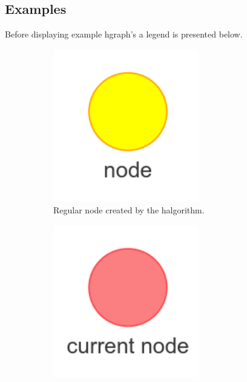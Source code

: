 \subsection{Examples}%
\label{subsec:hgraph_example}

Before displaying example \ac{hgraph}'s a legend is presented below.\bs

\begin{figure}[H]
    \centering
    \begin{subfigure}{0.2\textwidth}
    \centering
    \includegraphics[width=0.7\textwidth]{figures/connecting_nodes/legend/node}
    \caption{Regular node created by the \ac{halgorithm}.\newline}%
    \end{subfigure}
    \begin{subfigure}{0.2\textwidth}
    \centering
    \includegraphics[width=0.7\textwidth]{figures/connecting_nodes/legend/current_node}

\end{subfigure}
\end{figure}
